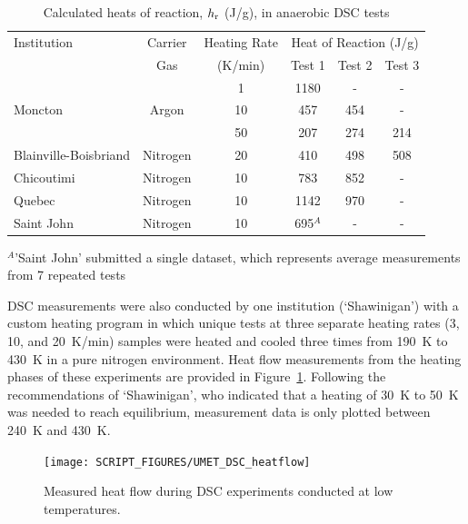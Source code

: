 \documentclass{book}
\begin{document}
\newpage
\begin{table}[h]
\caption{Calculated heats of reaction, $h_{\rm r}$ (J/g), in anaerobic DSC tests}
\label{Table_11}
\begin{center}
\begin{tabular}{|l|c|c|ccc|}
\hline
Institution           & Carrier     & Heating Rate         & \multicolumn{3}{|c|}{Heat of Reaction (J/g)} \\ \cline{4-6}
                      & Gas         & (K/min)              & Test 1  & Test 2  & Test 3                 \\ \hline
                      &             & 1                    & 1180    & -       & -                      \\
Moncton               & Argon       & 10                   & 457     & 454     & -                      \\
                      &             & 50                   & 207     & 274     & 214                    \\ \hline
Blainville-Boisbriand & Nitrogen    & 20                   & 410     & 498     & 508                    \\ \hline
Chicoutimi            & Nitrogen    & 10                   & 783     & 852     & -                      \\ \hline
Quebec                & Nitrogen    & 10                   & 1142    & 970     & -                      \\ \hline
Saint John            & Nitrogen    & 10                   & 695$^A$ & -       & -                      \\ \hline
\end{tabular}
\end{center}
$^A$'Saint John' submitted a single dataset, which represents average measurements from 7 repeated tests
\end{table}

DSC measurements were also conducted by one institution (‘Shawinigan’) with a custom heating program in which unique tests at three separate heating rates (3, 10, and 20~K/min) samples were heated and cooled three times from 190~K to 430~K in a pure nitrogen environment. Heat flow measurements from the heating phases of these experiments are provided in Figure~\ref{Fig:UMET_DSC_heatflow}. Following the recommendations of ‘Shawinigan’, who indicated that a heating of 30~K to 50~K was needed to reach equilibrium, measurement data is only plotted between 240~K and 430~K.

\begin{figure}[h]
  \centering
  \texttt{[image: SCRIPT\_FIGURES/UMET\_DSC\_heatflow]}
  \caption{Measured heat flow during DSC experiments conducted at low temperatures.}
  \label{Fig:UMET_DSC_heatflow}
\end{figure}
\end{document}
